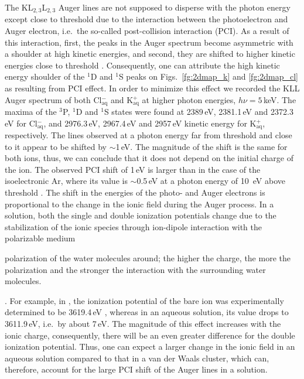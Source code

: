 The KL$_{2,3}$L$_{2,3}$ Auger lines are not supposed to disperse with the photon energy except close to threshold due to the interaction between the photoelectron and Auger electron, i.e.\ the so-called post-collision interaction (PCI). As a result of this interaction, first, the peaks in the Auger spectrum become asymmetric with a shoulder at high kinetic energies, and second, they are shifted to higher kinetic energies close to threshold \citep{russek86:911,guillemin15:012503}. Consequently, one can attribute the high kinetic energy shoulder of the $^1$D and $^1$S peaks on Figs.\ \ref{fg:2dmap_k} and \ref{fg:2dmap_cl} as resulting from PCI effect. In order to minimize this effect we recorded the KLL Auger spectrum of both Cl$^{-}_{\text{aq}}$ and K$^{+}_{\text{aq}}$ at higher photon energies, $h\nu = 5$\,keV. The maxima of the $^3$P, $^1$D and $^1$S states were found at 2389\,eV, 2381.1\,eV and 2372.3\,eV for Cl$^{-}_{\text{aq}}$, and 2976.3\,eV, 2967.4\,eV and 2957\,eV kinetic energy for K$^{+}_{\text{aq}}$, respectively. The lines observed at a photon energy far from threshold and close to it appear to be shifted by $\sim$1\,eV. The magnitude of the shift is the same for both ions, thus, we can conclude that it does not depend on the initial charge of the ion. The observed PCI shift of 1\,eV is larger than in the case of the isoelectronic Ar, where its value is $\sim$0.5\,eV at a photon energy of 10 \,eV above threshold \citep{guillemin15:012503}. The shift in the energies of the photo- and Auger electrons is proportional to the change in the ionic field during the Auger process. In a solution, both the single and double ionization potentials change due to the stabilization of the ionic species through ion-dipole interaction with the polarizable medium

{\color{red}
polarization of the water molecules around; the higher the charge, the more the polarization and the stronger the interaction with the surrounding water molecules.
}

. For example, in \ki, the ionization potential of the bare ion was experimentally determined to be 3619.4\,eV \citep{hertlein06:062715}, whereas in an aqueous solution, its value drops to 3611.9\,eV, i.e.\ by about 7\,eV. The magnitude of this effect increases with the ionic charge, consequently, there will be an even greater difference for the double ionization potential. Thus, one can expect a larger change in the ionic field in an aqueous solution compared to that in a van der Waals cluster, which can, therefore, account for the large PCI shift of the Auger lines in a solution.


